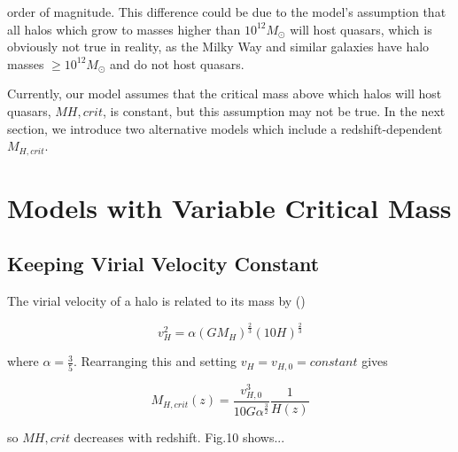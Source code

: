 \documentclass[12pt, twocolumn]{report}%
\begin{document}
\twocolumngrid


  order of magnitude. This difference could be due to the model's assumption that all halos which grow to masses higher than $10^12M_\odot$ will host quasars, which is obviously not true in reality, as the Milky Way and similar galaxies have halo masses $\geq10^{12}M_\odot$ and do not host quasars.\par

Currently, our model assumes that the critical mass above which halos will host quasars, $M{H,crit}$, is constant, but this assumption may not be true. In the next section, we introduce two alternative models which include a redshift-dependent $M_{H,crit}$.

\section{Models with Variable Critical Mass}
\subsection{Keeping Virial Velocity Constant}

The virial velocity of a halo is related to its mass by (\cite{Ikea})

\begin{equation}
    v_H^2=\alpha(GM_H)^{\frac{2}{3}}(10H)^{\frac{2}{3}}
\end{equation}

\noindent where $\alpha=\frac{3}{5}$. Rearranging this and setting $v_H=v_{H,0}=constant$ gives

\begin{equation}
    M_{H,crit}(z)=\frac{v_{H,0}^3}{10G\alpha^{\frac{3}{2}}}\frac{1}{H(z)}
\end{equation}

\noindent so $M{H,crit}$ decreases with redshift. Fig.10 shows...


\end{document}
